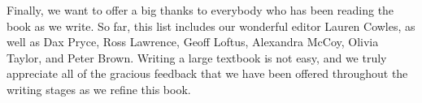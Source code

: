 Finally, we want to offer a big thanks to everybody who has been reading the book as we write. So far, this list includes our wonderful editor Lauren Cowles, as well as Dax Pryce, Ross Lawrence, Geoff Loftus, Alexandra McCoy, Olivia Taylor, and Peter Brown. Writing a large textbook is not easy, and we truly appreciate all of the gracious feedback that we have been offered throughout the writing stages as we refine this book.


